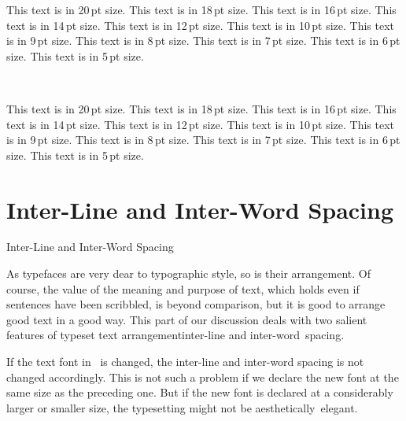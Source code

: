 {{\nopagebreak
{\twentycaps \fontss This text is in 20\,pt size.}
{\eighteencaps \fontss This text is in 18\,pt size.}
{\sixteencaps \fontss This text is in 16\,pt size.}
{\fourteencaps \fontss This text is in 14\,pt size.}
{\twelvecaps \fontss This text is in 12\,pt size.}
{\caps \fontss This text is in 10\,pt size.}
{\ninecaps \fontss This text is in 9\,pt size.}
{\eightcaps \fontss This text is in 8\,pt size.}
{\sevencaps \fontss This text is in 7\,pt size.}
{\sixcaps \fontss This text is in 6\,pt size.}
{\fivecaps \fontss This text is in 5\,pt size.}

\

\nopagebreak
{\twentycapsbf \fontss This text is in 20\,pt size.}
{\eighteencapsbf \fontss This text is in 18\,pt size.}
{\sixteencapsbf \fontss This text is in 16\,pt size.}
{\fourteencapsbf \fontss This text is in 14\,pt size.}
{\twelvecapsbf \fontss This text is in 12\,pt size.}
{\capsbf \fontss This text is in 10\,pt size.}
{\ninecapsbf \fontss This text is in 9\,pt size.}
{\eightcapsbf \fontss This text is in 8\,pt size.}
{\sevencapsbf \fontss This text is in 7\,pt size.}
{\sixcapsbf \fontss This text is in 6\,pt size.}
{\fivecapsbf \fontss This text is in 5\,pt size.}
}














\section{Inter-Line and Inter-Word Spacing}{Inter-Line and Inter-Word Spacing}

\ii As typefaces are very dear to typographic style, so is their arrangement. Of course, the value of the meaning and purpose of text, which holds even if sentences have been scribbled, is beyond comparison, but it is good to arrange good text in a good way. This part of our discussion deals with two salient features of typeset text arrangement\emdash inter-line and inter-word~spacing.

If the text font in \capstex\ is changed, the inter-line and inter-word spacing is not changed accordingly. This is not such a problem if we declare the new font at the same size as the preceding one. But if the new font is declared at a considerably larger or smaller size, the typesetting might not be aesthetically~elegant.

}

